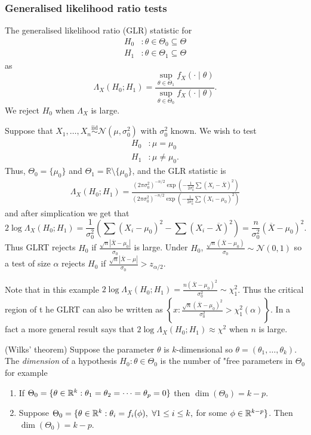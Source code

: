 \documentclass{article}
\newcommand{\iid}{\overset{\text{iid}}{\sim}}
\begin{document}
\subsubsection{Generalised likelihood ratio tests}
The generalised likelihood ratio (GLR) statistic for
\begin{align*}
	H_0 &: \theta \in \Theta_0 \subseteq \Theta\\
	H_1 &: \theta \in \Theta_1 \subseteq \Theta
\end{align*}
as
\[
	\Lambda_X(H_0;H_1) = \frac{\sup_{\theta\in\Theta_1} f_X(\cdot \mid \theta)}{\sup_{\theta\in \Theta_0}f_X(\cdot\mid \theta)}.
\]
We reject $ H_0 $ when $ \Lambda_X $ is large.\par
Suppose that $ X_1,\dots, X_n\iid \mathcal N(\mu,\sigma^2_0) $ with $ \sigma_0^2 $ known. We wish to test
\begin{align*}
	H_0&: \mu = \mu_0\\
	H_1&: \mu \ne \mu_0.
\end{align*}
Thus, $ \Theta_0 = \{\mu_0\} $ and $ \Theta_1 = \mathbb R \setminus \{\mu_0\} $, and the GLR statistic is
\begin{align*}
	\Lambda_X(H_0;H_1) = \frac{(2\pi \sigma_0^2)^{-n/2}\exp\left(-\frac 1{2\sigma_0^2} \sum(X_i - \overline X)^2\right)}{(2\pi \sigma_0^2)^{-n/2} \exp\left(-\frac 1{2\sigma_0^2}\sum(X_i - \mu_0)^2\right)}
\end{align*}
and after simplication we get that
\[
	2\log \Lambda_X(H_0;H_1) = \frac 1{\sigma_0^2} \left(\sum(X_i-\mu_0)^2 - \sum(X_i-\overline X)^2\right) = \frac n {\sigma^2_0} (\overline X - \mu_0)^2.
\]
Thus GLRT rejects $ H_0 $ if $ \frac{\sqrt n |\overline X - \mu_0|}{\sigma_0} $ is large. Under $ H_0 $, $ \frac{\sqrt n(\overline X - \mu_0)}{\sigma_0} \sim\mathcal N(0,1) $ so a test of size $ \alpha $ rejects $ H_0 $ if $ \frac{\sqrt n|\overline X - \mu|}{\sigma_0}>z_{\alpha/2} $.
\par
Note that in this example $ 2\log \Lambda_X(H_0;H_1) = \frac{n(\overline X-\mu_0)^2}{\sigma^2_0}\sim \chi^2_1 $. Thus the critical region of t he GLRT can also be written as $ \left\{x:\frac{\sqrt n(\overline X - \mu_0)^2}{\sigma_0^2} > \chi_1^2(\alpha)\right\} $. In a fact a more general result says that $ 2\log\Lambda_X(H_0;H_1) \approx \chi^2 $ when $ n $ is large.
\begin{theorem}
	(Wilks' theorem) Suppose the parameter $ \theta $ is $ k $-dimensional so $ \theta = (\theta_1,\dots, \theta_k) $. The \textit{dimension} of a hypothesis $ H_0:\theta\in\Theta_0 $ is the number of "free parameters in $ \Theta_0 $ for example
	\begin{enumerate}
		\item If $ \Theta_0= \{\theta\in \mathbb{R}^k:\theta_1=\theta_2=\dots = \theta_p = 0\} $ then $ \dim(\Theta_0) = k-p $.
		\item Suppose $ \Theta_0 = \{\theta\in\mathbb{R}^k: \theta_i = f_i(\phi),\ \forall 1\le i \le k, $ for some $ \phi\in\mathbb{R}^{k-p}\} $. Then $ \dim(\Theta_0) = k-p $.
	\end{enumerate}
\end{theorem}
\end{document}

